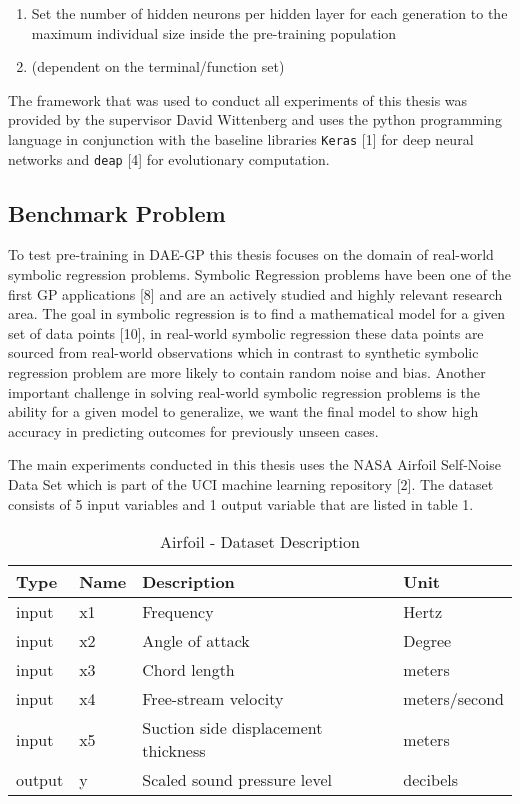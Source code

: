 \documentclass[
  11pt,
]{article}
\providecommand{\tightlist}{%
  \setlength{\itemsep}{0pt}\setlength{\parskip}{0pt}}
\begin{document}
\begin{enumerate}
\def\labelenumi{\arabic{enumi}.}
\tightlist
\item
  Set the number of hidden neurons per hidden layer for each generation
  to the maximum individual size inside the pre-training population
\item
  (dependent on the terminal/function set)
\end{enumerate}

The framework that was used to conduct all experiments of this thesis
was provided by the supervisor David Wittenberg and uses the python
programming language in conjunction with the baseline libraries
\texttt{Keras} {[}1{]} for deep neural networks and \texttt{deap}
{[}4{]} for evolutionary computation.

\hypertarget{benchmark-problem}{%
\subsection{Benchmark Problem}\label{benchmark-problem}}

To test pre-training in DAE-GP this thesis focuses on the domain of
real-world symbolic regression problems. Symbolic Regression problems
have been one of the first GP applications {[}8{]} and are an actively
studied and highly relevant research area. The goal in symbolic
regression is to find a mathematical model for a given set of data
points {[}10{]}, in real-world symbolic regression these data points are
sourced from real-world observations which in contrast to synthetic
symbolic regression problem are more likely to contain random noise and
bias. Another important challenge in solving real-world symbolic
regression problems is the ability for a given model to generalize, we
want the final model to show high accuracy in predicting outcomes for
previously unseen cases.

The main experiments conducted in this thesis uses the NASA Airfoil
Self-Noise Data Set which is part of the UCI machine learning repository
{[}2{]}. The dataset consists of 5 input variables and 1 output variable
that are listed in table 1.

\begin{table}[!h]

\caption{\label{tab:airfoil_dataset_description}Airfoil - Dataset Description}
\centering
\begin{tabular}[t]{l|l|l|l}
\hline
\textbf{Type} & \textbf{Name} & \textbf{Description} & \textbf{Unit}\\
\hline
input & x1 & Frequency & Hertz\\
\hline
input & x2 & Angle of attack & Degree\\
\hline
input & x3 & Chord length & meters\\
\hline
input & x4 & Free-stream velocity & meters/second\\
\hline
input & x5 & Suction side displacement thickness & meters\\
\hline
output & y & Scaled sound pressure level & decibels\\
\hline
\end{tabular}
\end{table}
\end{document}
